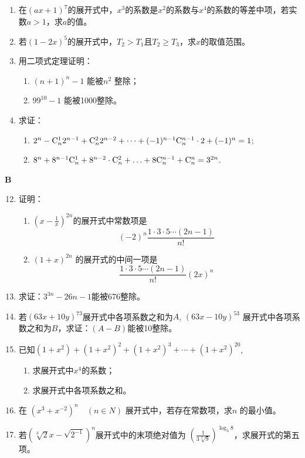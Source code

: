 \begin{enumerate}
 \item 在$ (ax+1)^{7} $的展开式中，$ x^{3} $的系数是$ x^{2} $的系数与$ x^{4} $的系数的等差中项，若实数$ a>1$，求$a$的值。

 \item 若$(1-2x)^{5} $的展开式中，$T_{2}>T_{1} $且$T_{2}\ge T_{3}$，求$x$的取值范围。

 \item 用二项式定理证明：
\begin{enumerate}[(1)]
    \item $(n+1)^{n}-1$ 能被$n^{2}$ 整除；
    \item $99^{10}-1$ 能被1000整除。
\end{enumerate}

\item 求证：
\begin{enumerate}[(1)]
 \item $2^{n}-\comb{n}{1}2^{n-1}+\comb{n}{2}2^{n-2}+\cdots +(-1)^{n-1}\comb{n }{n-1}\cdot  2+(-1)^{n}=1$;
   \item $8^{n}+8^{n-1}\comb{n}{1}+8^{n-2}\cdot  \comb{n }{2}+\ldots +8\comb{n}{n-1}+\comb{n}{n}=3^{2n}$. 
\end{enumerate}
\end{enumerate}


\begin{center}
    \bfseries B
\end{center}

\begin{enumerate}
 \setcounter{enumi}{11}  
  \item 证明：
  \begin{enumerate}[(1)]
    \item $\left(x-\frac{1}{x}\right)^{2n} $的展开式中常数项是
\[(-2)^{n}\frac{1\cdot  3\cdot  5\cdots (2n-1)}{n!}\]
\item $(1+x)^{2n}$ 的展开式的中间一项是
\[\frac{1\cdot  3\cdot  5\cdots (2n-1)}{n!}(2x)^{n}\]
\end{enumerate}

\item 求证：$ 3^{3n}-26n-1 $能被676整除。
\item 若$ (63x+10y)^{73} $展开式中各项系数之和为$A$, $(63x- 10y)^{53}$ 展开式中各项系数之和为$B$，求证：$ (A-B) $能被10整除。

\item 已知$ \left(1+x^{2}\right)+\left(1+x^{2}\right)^{2}+\left(1+x^{2}\right)^{3}+\cdots +\left(1+x^{2}\right)^{20}$,
\begin{enumerate}[(1)]
   \item 求展开式中$ x^{4} $的系数；
  \item 求展开式中各项系数之和。
\end{enumerate}
\item 在 $\left(x^{3}+x^{-2}\right)^{n}\quad (n\in N)$ 展开式中，若存在常数项，求$n$
的最小值。

\item 若$(\sqrt[3]{2}x-\sqrt{2^{-1}})^{n} $展开式中的末项绝对值为 $\left(\frac{1}{3\sqrt[3]{9}}\right)^{\log_{3}{8}}$，求展开式的第五项。
\end{enumerate}




